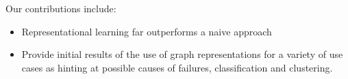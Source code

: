 Our contributions include:
\begin{itemize}
\item Representational learning far outperforms a naive approach 
\item Provide initial results of the use of graph representations for a variety of use cases as hinting at possible causes of failures, classification and clustering.
\end{itemize}


